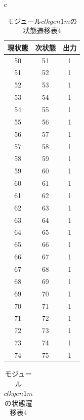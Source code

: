\documentclass[a4paper]{jarticle}
\begin{document}
\begin{table}[!h]
	\begin{center}
		\begin{tabular}{c}
			\begin{minipage}{0.5\hsize}
				\begin{center}
					\caption{モジュール$clkgen1m$の状態遷移表3}
					\label{Work18StateTransitionTable3}
					\begin{tabular}{|c|c|c|}
					\hline
					現状態	&次状態	&出力\\	\hline\hline
					50	&51	&1\\	\hline
					51	&52	&1\\	\hline
					52	&53	&1\\	\hline
					53	&54	&1\\	\hline
					54	&55	&1\\	\hline
					55	&56	&1\\	\hline
					56	&57	&1\\	\hline
					57	&58	&1\\	\hline
					58	&59	&1\\	\hline
					59	&60	&1\\	\hline
					60	&61	&1\\	\hline
					61	&62	&1\\	\hline
					62	&63	&1\\	\hline
					63	&64	&1\\	\hline
					64	&65	&1\\	\hline
					65	&66	&1\\	\hline
					66	&67	&1\\	\hline
					67	&68	&1\\	\hline
					68	&69	&1\\	\hline
					69	&70	&1\\	\hline
					70	&71	&1\\	\hline
					71	&72	&1\\	\hline
					72	&73	&1\\	\hline
					73	&74	&1\\	\hline
					74	&75	&1\\	\hline
					\end{tabular}
				\end{center}
			\end{minipage}
			\begin{minipage}{0.5\hsize}
				\begin{center}
					\caption{モジュール$clkgen1m$の状態遷移表4}
					\label{Work18StateTransitionTable4}
					\begin{tabular}{|c|c|c|}

\end{tabular}
\end{center}
\end{minipage}
\end{tabular}
\end{center}
\end{table}
\end{document}

